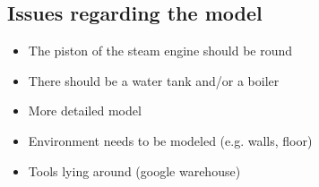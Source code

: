\documentclass{scrartcl}
\begin{document}
\subsection*{Issues regarding the model}
\begin{itemize}
	\item The piston of the steam engine should be round
	\item There should be a water tank and/or a boiler
	\item More detailed model
	\item Environment needs to be modeled (e.g. walls, floor)
	\item Tools lying around (google warehouse)
\end{itemize}

% 
 
\end{document}
